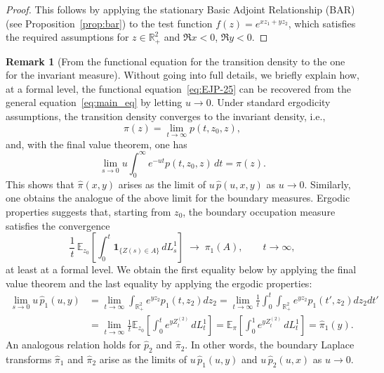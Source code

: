 \documentclass[11pt]{article}
\theoremstyle{definition}
\newtheorem{rem}[thm]{Remark}
\begin{document}
\begin{proof}
This follows by applying the stationary Basic Adjoint Relationship (BAR) (see Proposition~\ref{prop:bar}) to the test function $f(z)=e^{x z_1+y z_2}$, which satisfies the required assumptions for $z\in\mathbb{R}_+^2$ and $\Re x<0$, $\Re y<0$.
\end{proof}
\begin{rem}[From the functional equation for the transition density to the one for the invariant measure]
Without going into full details, we briefly explain how, at a formal level, the functional equation~\eqref{eq:EJP-25} can be recovered from the general equation~\eqref{eq:main_eq} by letting $u\to 0$. Under standard ergodicity assumptions, the transition density converges to the invariant density, i.e.,
\[
\pi(z)=\lim_{t\to\infty} p(t,z_0,z),
\]
and, with the final value theorem, one has
\[
\lim_{s\to 0} u \int_0^\infty e^{-ut} p(t,z_0,z)\,dt = \pi(z).
\]
This shows that $\widehat \pi (x,y)$ arises as the limit of $u\,\widehat p(u,x,y)$ as $u\to 0$. %
Similarly, one obtains the analogue of the above limit for the boundary measures.  
Ergodic properties suggests that, starting from $z_0$, the boundary occupation measure satisfies the convergence
\[
\frac{1}{t}\,\mathbb{E}_{z_0}\!\left[\int_0^t \mathbf{1}_{\{Z(s)\in A\}}\, dL_s^1 \right]
\;\longrightarrow\;
\pi_1(A),
\qquad t\to\infty,
\]
at least at a formal level.
We obtain the first equality below by applying the final value theorem and the last equality by applying the ergodic properties:
\begin{align*}
\label{eq:final_value_boundary}
\lim_{s\to 0}
u\,\widehat p_1(u,y)
&= \lim_{t\to\infty}\int_{\mathbb R_+^2} e^{y z_2 }p_1(t,z_2) d z_2
=\lim_{t\to\infty} \frac{1}{t} \int_0^t \int_{\mathbb{R}_+^2} e^{y z_2 }p_1(t',z_2) d z_2 dt'
\\ &=\lim_{t\to\infty} \frac{1}{t}
\mathbb{E}_{z_0} \!\left[ \int_0^t e^{y Z_t^{(2)}}\, dL_t^1 \right]
=\mathbb{E}_{\pi} \!\left[ \int_0^1 e^{y Z_t^{(2)}}\, dL_t^1 \right]=
\widehat \pi_1(y).
\end{align*}
An analogous relation holds for $\widehat p_2$ and $\widehat \pi_2$.
In other words, the boundary Laplace transforms $\widehat \pi_1$ and $\widehat \pi_2$ arise as the limits of $u\,\widehat p_1(u,y)$ and $u\,\widehat p_2(u,x)$ as $u\to 0$.
\end{rem}
\end{document}
